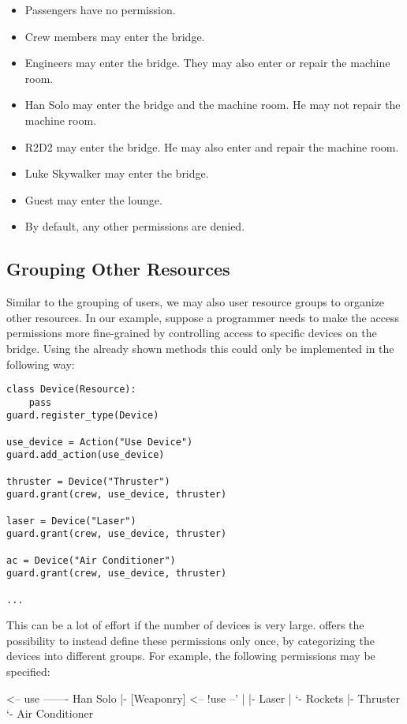 \begin{itemize}
\item Passengers have no permission.
\item Crew members may enter the bridge.
\item Engineers may enter the bridge. They may also enter or repair the 
machine room.
\item Han Solo may enter the bridge and the machine room. He may not repair 
the machine room.
\item R2D2 may enter the bridge. He may also enter and repair the machine 
room.
\item Luke Skywalker may enter the bridge.
\item Guest may enter the lounge.
\item By default, any other permissions are denied.
\end{itemize}


\subsection{Grouping Other Resources}

Similar to the grouping of users, we may also user resource groups to 
organize other resources.
In our example, suppose a programmer needs to make the access permissions 
more fine-grained by controlling access to specific devices on the bridge.
Using the already shown methods this could only be implemented in the 
following way:

\begin{lstlisting}
class Device(Resource):
    pass
guard.register_type(Device)

use_device = Action("Use Device")
guard.add_action(use_device)

thruster = Device("Thruster")
guard.grant(crew, use_device, thruster)

laser = Device("Laser")
guard.grant(crew, use_device, thruster)

ac = Device("Air Conditioner")
guard.grant(crew, use_device, thruster)

...
\end{lstlisting}

This can be a lot of effort if the number of devices is very large.
\product offers the possibility to instead define these permissions only 
once, by categorizing the devices into different groups. For example, 
the following permissions may be specified:

\begin{indentverb}
[Devices] <-- use ------- Han Solo
  |- [Weaponry] <-- !use --'
  |   |- Laser
  |   `- Rockets
  |- Thruster
  `- Air Conditioner
\end{indentverb}

